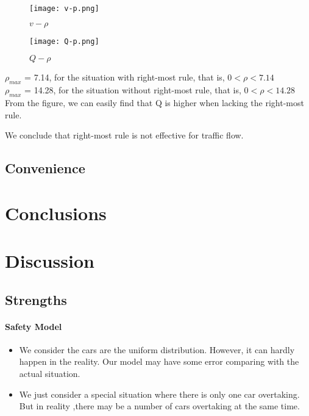 \begin{figure}
\centering
	\texttt{[image: v-p.png]}
\caption{$v - \rho$}
\end{figure}

\begin{figure}
\centering
	\texttt{[image: Q-p.png]}
	\caption{$Q-\rho$}
\end{figure}

$\rho_{max}$ = 7.14, for the situation with
right-most rule, that is, $ 0 < \rho < 7.14$\\
$\rho_{max}$ = 14.28, for the situation without
right-most rule, that is, $0 < \rho < 14.28$\\
From the figure, we can easily find that
Q is higher when lacking the right-most rule.

We conclude that right-most rule is not effective
for traffic flow.
 
\subsection{Convenience}

\section{Conclusions}




\section{Discussion}

\subsection{Strengths}

\paragraph{Safety Model}

\begin{itemize}
\item We consider the cars are the uniform distribution. However, it can hardly happen in the reality. Our model may have some error comparing with the actual situation.
\item We just consider a special situation where there is only one car overtaking. But in reality ,there may be a number of cars overtaking at the same time.
\end{itemize}

